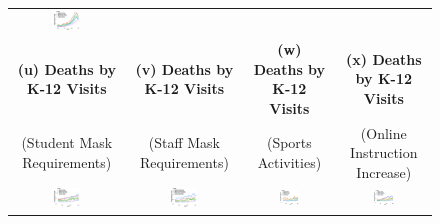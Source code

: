 \documentclass[9pt,twoside,lineno]{pnas-new}
\theoremstyle{definition}
\begin{document}
\begin{figure}[ht]
{\begin{minipage}{\linewidth}
\begin{tabular}{cccc}
      \includegraphics[width=0.25\textwidth]{tables_and_figures/school-weekcase-online-simple}  \\
    \textbf{(u)  Deaths by K-12 Visits}  &\textbf{(v) Deaths by K-12 Visits}&\textbf{(w) Deaths by K-12 Visits }&\textbf{(x) Deaths by K-12 Visits}\\
    (Student Mask Requirements)&(Staff Mask Requirements)&   (Sports Activities)&   (Online Instruction Increase) \\  
      \includegraphics[width=0.25\textwidth]{tables_and_figures/school-weekdeath-simple}&  
      \includegraphics[width=0.25\textwidth]{tables_and_figures/school-weekdeath-staff-simple}&  
      \includegraphics[width=0.25\textwidth]{tables_and_figures/school-weekdeath-sports-simple} &  
      \includegraphics[width=0.25\textwidth]{tables_and_figures/school-weekdeath-online-simple}  
    \end{tabular} 
  \end{minipage}}  
\vspace{-0.2cm}  {\scriptsize
\begin{flushleft}


\end{flushleft}}
\end{figure}
\end{document}
